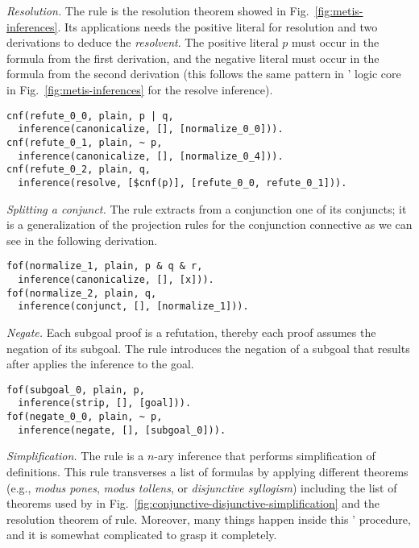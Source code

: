 \documentclass[../main.tex]{subfiles}
\begin{document}

\textit{Resolution.} The \resolve rule is the resolution
theorem showed in Fig.~\ref{fig:metis-inferences}. Its applications
needs the positive literal for resolution and two
derivations to deduce the \emph{resolvent}.
The positive literal $p$ must occur in the formula from the first derivation,
and the negative literal must occur in the formula from the second derivation
(this follows the same pattern in \Metis' logic core in
Fig.~\ref{fig:metis-inferences} for the resolve inference).

\begin{verbatim}
cnf(refute_0_0, plain, p | q,
  inference(canonicalize, [], [normalize_0_0])).
cnf(refute_0_1, plain, ~ p,
  inference(canonicalize, [], [normalize_0_4])).
cnf(refute_0_2, plain, q,
  inference(resolve, [$cnf(p)], [refute_0_0, refute_0_1])).
\end{verbatim}


\textit{Splitting a conjunct.}
The \conjunct rule extracts from a conjunction one of its conjuncts; it is
a generalization of the projection rules for the conjunction connective as
we can see in the following \TSTP derivation.

\begin{verbatim}
fof(normalize_1, plain, p & q & r,
  inference(canonicalize, [], [x])).
fof(normalize_2, plain, q,
  inference(conjunct, [], [normalize_1])).
\end{verbatim}

\textit{Negate.}
Each subgoal proof is a refutation, thereby each proof assumes
the negation of its subgoal. The \negate rule
introduces the negation of a subgoal that results
after applies the \strip inference to the goal.

\begin{verbatim}
fof(subgoal_0, plain, p,
  inference(strip, [], [goal])).
fof(negate_0_0, plain, ~ p,
  inference(negate, [], [subgoal_0])).
\end{verbatim}


\textit{Simplification.} %
The \simplify rule is a $n$-ary inference that performs simplification
of definitions. This rule transverses a list of formulas by
applying different theorems (e.g., \emph{modus pones}, \emph{modus tollens},
or \emph{disjunctive syllogism}) including the list of theorems used by
\canonicalize in Fig.~\ref{fig:conjunctive-disjunctive-simplification}
and the resolution theorem of \resolve rule.
Moreover, many things happen inside this \Metis' procedure, and
it is somewhat complicated to grasp it completely.
\end{document}
